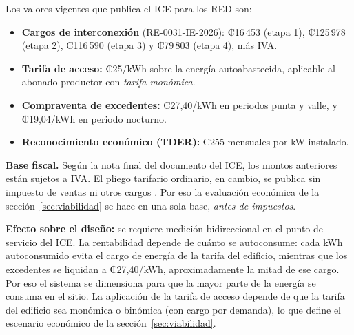 \documentclass[12pt]{article}
\begin{document}
Los valores vigentes que publica el ICE para los RED \cite{iceTarRED} son:
\begin{itemize}
\item \textbf{Cargos de interconexión} (RE-0031-IE-2026): ₡16\,453 (etapa 1), ₡125\,978 (etapa 2), ₡116\,590 (etapa 3) y ₡79\,803 (etapa 4), más IVA.
\item \textbf{Tarifa de acceso:} ₡25/kWh sobre la energía autoabastecida, aplicable al abonado productor con \emph{tarifa monómica}.
\item \textbf{Compraventa de excedentes:} ₡27,40/kWh en periodos punta y valle, y ₡19,04/kWh en periodo nocturno.
\item \textbf{Reconocimiento económico (TDER):} ₡255 mensuales por kW instalado.
\end{itemize}

\textbf{Base fiscal.} Según la nota final del documento del ICE, los montos anteriores están sujetos a IVA. El pliego tarifario ordinario, en cambio, se publica sin impuesto de ventas ni otros cargos \cite{icePliego}. Por eso la evaluación económica de la sección~\ref{sec:viabilidad} se hace en una sola base, \emph{antes de impuestos}.

\textbf{Efecto sobre el diseño:} se requiere medición bidireccional en el punto de servicio del ICE. La rentabilidad depende de cuánto se autoconsume: cada kWh autoconsumido evita el cargo de energía de la tarifa del edificio, mientras que los excedentes se liquidan a ₡27,40/kWh, aproximadamente la mitad de ese cargo. Por eso el sistema se dimensiona para que la mayor parte de la energía se consuma en el sitio. La aplicación de la tarifa de acceso depende de que la tarifa del edificio sea monómica o binómica (con cargo por demanda), lo que define el escenario económico de la sección~\ref{sec:viabilidad}.
\end{document}

